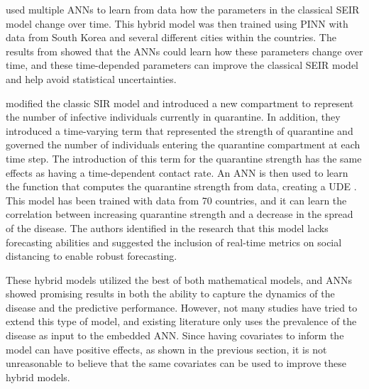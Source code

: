 \citeauthor{jungRealWorldImplicationsRapidly2020} \cite{jungRealWorldImplicationsRapidly2020} used multiple \glspl{ANN} to learn from data how the parameters in the classical \gls{SEIR} model change over time.
This hybrid model was then trained using \gls{PINN} \cite{raissiPhysicsinformedNeuralNetworks2019} with data from South Korea and several different cities within the countries.
The results from \cite{jungRealWorldImplicationsRapidly2020} showed that the \glspl{ANN} could learn how these parameters change over time, and these time-depended parameters can improve the classical \gls{SEIR} model and help avoid statistical uncertainties.

\citeauthor{dandekarMachineLearningAidedGlobal2020a} \cite{dandekarMachineLearningAidedGlobal2020a} modified the classic \gls{SIR} model and introduced a new compartment to represent the number of infective individuals currently in quarantine.
In addition, they introduced a time-varying term that represented the strength of quarantine and governed the number of individuals entering the quarantine compartment at each time step.
The introduction of this term for the quarantine strength has the same effects as having a time-dependent contact rate.
An \gls{ANN} is then used to learn the function that computes the quarantine strength from data, creating a \gls{UDE} \cite{rackauckasUniversalDifferentialEquations2020}.
This model has been trained with data from 70 countries, and it can learn the correlation between increasing quarantine strength and a decrease in the spread of the disease.
The authors identified in the research that this model lacks forecasting abilities and suggested the inclusion of real-time metrics on social distancing to enable robust forecasting.

These hybrid models utilized the best of both mathematical models, and \glspl{ANN} showed promising results in both the ability to capture the dynamics of the disease and the predictive performance.
However, not many studies have tried to extend this type of model, and existing literature only uses the prevalence of the disease as input to the embedded \gls{ANN}.
Since having covariates to inform the model can have positive effects, as shown in the previous section, it is not unreasonable to believe that the same covariates can be used to improve these hybrid models.